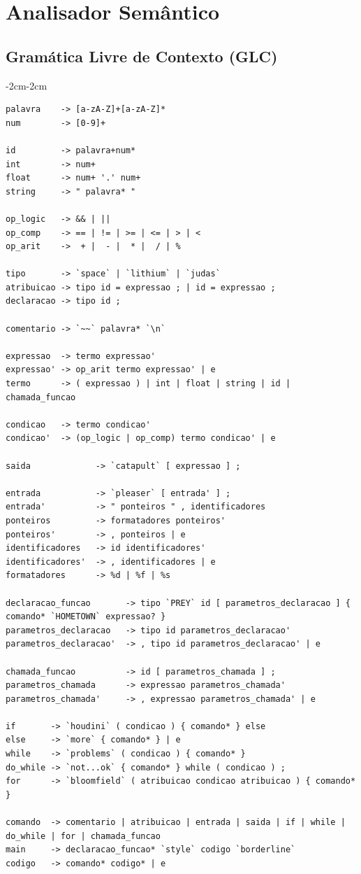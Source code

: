 \documentclass[a4paper,12pt]{article}
\begin{document}
\newpage
\section{Analisador Semântico}
\subsection{Gramática Livre de Contexto (GLC)}

\begin{adjustwidth}{-2cm}{-2cm}
\begin{lstlisting}[basicstyle=\ttfamily\scriptsize]
palavra    -> [a-zA-Z]+[a-zA-Z]*
num        -> [0-9]+

id         -> palavra+num*
int        -> num+
float      -> num+ '.' num+
string     -> " palavra* "

op_logic   -> && | ||
op_comp    -> == | != | >= | <= | > | <
op_arit    ->  + |  - |  * |  / | %

tipo       -> `space` | `lithium` | `judas`
atribuicao -> tipo id = expressao ; | id = expressao ;
declaracao -> tipo id ;

comentario -> `~~` palavra* `\n`

expressao  -> termo expressao'
expressao' -> op_arit termo expressao' | e
termo      -> ( expressao ) | int | float | string | id | chamada_funcao

condicao   -> termo condicao'
condicao'  -> (op_logic | op_comp) termo condicao' | e

saida             -> `catapult` [ expressao ] ;

entrada           -> `pleaser` [ entrada' ] ;
entrada'          -> " ponteiros " , identificadores
ponteiros         -> formatadores ponteiros'
ponteiros'        -> , ponteiros | e
identificadores   -> id identificadores'
identificadores'  -> , identificadores | e
formatadores      -> %d | %f | %s

declaracao_funcao       -> tipo `PREY` id [ parametros_declaracao ] { comando* `HOMETOWN` expressao? }
parametros_declaracao   -> tipo id parametros_declaracao'
parametros_declaracao'  -> , tipo id parametros_declaracao' | e

chamada_funcao          -> id [ parametros_chamada ] ;
parametros_chamada      -> expressao parametros_chamada'
parametros_chamada'     -> , expressao parametros_chamada' | e

if       -> `houdini` ( condicao ) { comando* } else
else     -> `more` { comando* } | e
while    -> `problems` ( condicao ) { comando* }
do_while -> `not...ok` { comando* } while ( condicao ) ;
for      -> `bloomfield` ( atribuicao condicao atribuicao ) { comando* }

comando  -> comentario | atribuicao | entrada | saida | if | while | do_while | for | chamada_funcao
main     -> declaracao_funcao* `style` codigo `borderline`
codigo   -> comando* codigo* | e
\end{lstlisting}
\end{adjustwidth}
\end{document}
